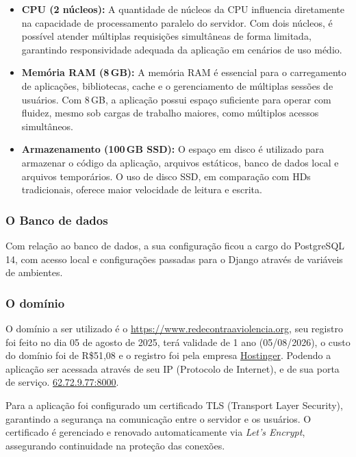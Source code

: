 \begin{itemize}
   \item \textbf{CPU (2 núcleos):} A quantidade de núcleos da CPU influencia diretamente na capacidade de processamento paralelo do servidor. Com dois núcleos, é possível atender múltiplas requisições simultâneas de forma limitada, garantindo responsividade adequada da aplicação em cenários de uso médio.

   \item \textbf{Memória RAM (8\,GB):} A memória RAM é essencial para o carregamento de aplicações, bibliotecas, cache e o gerenciamento de múltiplas sessões de usuários. Com 8\,GB, a aplicação possui espaço suficiente para operar com fluidez, mesmo sob cargas de trabalho maiores, como múltiplos acessos simultâneos.

   \item \textbf{Armazenamento (100\,GB SSD):} O espaço em disco é utilizado para armazenar o código da aplicação, arquivos estáticos, banco de dados local e arquivos temporários. O uso de disco SSD, em comparação com HDs tradicionais, oferece maior velocidade de leitura e escrita.
\end{itemize}


\subsubsection{O Banco de dados}
\par Com relação ao banco de dados, a sua configuração ficou a cargo do PostgreSQL 14, com acesso local e configurações passadas para o Django através de variáveis de ambientes.

\subsubsection{O domínio}
\par O domínio a ser utilizado é o \href{https://www.redecontraaviolencia.org}{https://www.redecontraaviolencia.org}, seu registro foi feito no dia 05 de agosto de 2025, terá validade de 1 ano (05/08/2026), o custo do domínio foi de R\$51,08 e o registro foi pela empresa \href{https://www.hostinger.com/br}{Hostinger}. Podendo a aplicação ser acessada através de seu IP (Protocolo de Internet), e de sua porta de serviço. \href{62.72.9.77:8000}{62.72.9.77:8000}.
\par Para a aplicação foi configurado um certificado TLS (Transport Layer Security), garantindo a segurança na comunicação entre o servidor e os usuários. O certificado é gerenciado e renovado automaticamente via \textit{Let's Encrypt}, assegurando continuidade na proteção das conexões.

